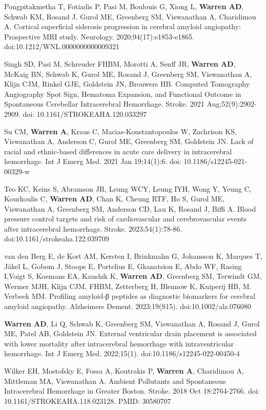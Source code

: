 \documentclass[10pt]{article} %
\begin{document}
\begin{thebibliography}{99}
 Pongpitakmetha T, Fotiadis P, Pasi M, Boulouis G, Xiong L, \textbf{Warren AD}, Schwab KM, Rosand J, Gurol ME, Greenberg SM, Viswanathan A, Charidimou A. Cortical superficial siderosis progression in cerebral amyloid angiopathy: Prospective MRI study. Neurology. 2020;94(17):e1853-e1865. doi:10.1212/WNL.0000000000009321

 Singh SD, Pasi M, Schreuder FHBM, Morotti A, Senff JR, \textbf{Warren AD}, McKaig BN, Schwab K, Gurol ME, Rosand J, Greenberg SM, Viswanathan A, Klijn CJM, Rinkel GJE, Goldstein JN, Brouwers HB. Computed Tomography Angiography Spot Sign, Hematoma Expansion, and Functional Outcome in Spontaneous Cerebellar Intracerebral Hemorrhage. Stroke. 2021 Aug;52(9):2902-2909. doi: 10.1161/STROKEAHA.120.033297

 Su CM, \textbf{Warren A}, Kraus C, Macias-Konstantopoulos W, Zachrison KS, Viswanathan A, Anderson C, Gurol ME, Greenberg SM, Goldstein JN. Lack of racial and ethnic-based differences in acute care delivery in intracerebral hemorrhage. Int J Emerg Med. 2021 Jan 19;14(1):6. doi: 10.1186/s12245-021-00329-w

 Teo KC, Keins S, Abramson JR, Leung WCY, Leung IYH, Wong Y, Yeung C, Kourkoulis C, \textbf{Warren AD}, Chan K, Cheung RTF, Ho S, Gurol ME, Viswanathan A, Greenberg SM, Anderson CD, Lau K, Rosand J, Biffi A. Blood pressure control targets and risk of cardiovascular and cerebrovascular events after intracerebral hemorrhage. Stroke. 2023;54(1):78-86. doi:10.1161/strokeaha.122.039709

 van den Berg E, de Kort AM, Kersten I, Brinkmalm G, Johansson K, Marques T, Jäkel L, Gobom J, Stoops E, Portelius E, Gkanatsiou E, Abdo WF, Rasing I,Voigt S, Koemans EA, Kaushik K, \textbf{Warren AD}, Greenberg SM, Terwindt GM, Wermer MJH, Klijn CJM, FHBM, Zetterberg H, Blennow K, Kuiperij HB, M. Verbeek MM. Profiling amyloid‐β peptides as diagnostic biomarkers for cerebral amyloid angiopathy. Alzheimers Dement. 2023;19(S15). doi:10.1002/alz.076080

 \textbf{Warren AD}, Li Q, Schwab K, Greenberg SM, Viswanathan A, Rosand J, Gurol ME, Patel AB, Goldstein JN. External ventricular drain placement is associated with lower mortality after intracerebral hemorrhage with intraventricular hemorrhage. Int J Emerg Med. 2022;15(1). doi:10.1186/s12245-022-00450-4

 Wilker EH, Mostofsky E, Fossa A, Koutrakis P, \textbf{Warren A}, Charidimou A, Mittleman MA, Viswanathan A. Ambient Pollutants and Spontaneous Intracerebral Hemorrhage in Greater Boston. Stroke. 2018 Oct 18:2764-2766. doi: 10.1161/STROKEAHA.118.023128. PMID: 30580707


\end{thebibliography}
\end{document}
